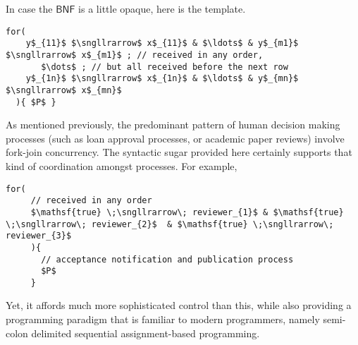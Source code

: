 In case the $\mathsf{BNF}$ is a little opaque, here is the template.

\begin{lstlisting}[mathescape=true]
  for(
    y$_{11}$ $\sngllrarrow$ x$_{11}$ & $\ldots$ & y$_{m1}$ $\sngllrarrow$ x$_{m1}$ ; // received in any order, 
       $\dots$ ; // but all received before the next row
    y$_{1n}$ $\sngllrarrow$ x$_{1n}$ & $\ldots$ & y$_{mn}$ $\sngllrarrow$ x$_{mn}$
  ){ $P$ }
\end{lstlisting}

As mentioned previously, the predominant pattern of human decision
making processes (such as loan approval processes, or academic paper
reviews) involve fork-join concurrency. The syntactic sugar provided
here certainly supports that kind of coordination amongst processes. For example,

\begin{lstlisting}[mathescape=true]
  for(
     // received in any order
     $\mathsf{true} \;\sngllrarrow\; reviewer_{1}$ & $\mathsf{true} \;\sngllrarrow\; reviewer_{2}$  & $\mathsf{true} \;\sngllrarrow\; reviewer_{3}$ 
     ){
       // acceptance notification and publication process
       $P$
     } 
\end{lstlisting}

Yet, it affords much more sophisticated control than this, while also
providing a programming paradigm that is familiar to modern
programmers, namely semi-colon delimited sequential assignment-based
programming.
